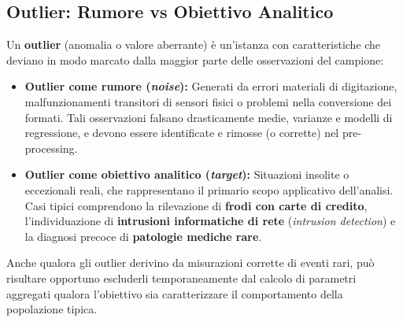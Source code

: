 \subsection{Outlier: Rumore vs Obiettivo Analitico}
Un \textbf{outlier} (anomalia o valore aberrante) \`e un'istanza con caratteristiche che deviano in modo marcato dalla maggior parte delle osservazioni del campione:
\begin{itemize}
    \item \textbf{Outlier come rumore (\textit{noise}):} Generati da errori materiali di digitazione, malfunzionamenti transitori di sensori fisici o problemi nella conversione dei formati. Tali osservazioni falsano drasticamente medie, varianze e modelli di regressione, e devono essere identificate e rimosse (o corrette) nel pre-processing.
    \item \textbf{Outlier come obiettivo analitico (\textit{target}):} Situazioni insolite o eccezionali reali, che rappresentano il primario scopo applicativo dell'analisi. Casi tipici comprendono la rilevazione di \textbf{frodi con carte di credito}, l'individuazione di \textbf{intrusioni informatiche di rete} (\textit{intrusion detection}) e la diagnosi precoce di \textbf{patologie mediche rare}.
\end{itemize}

Anche qualora gli outlier derivino da misurazioni corrette di eventi rari, pu\`o risultare opportuno escluderli temporaneamente dal calcolo di parametri aggregati qualora l'obiettivo sia caratterizzare il comportamento della popolazione tipica.

